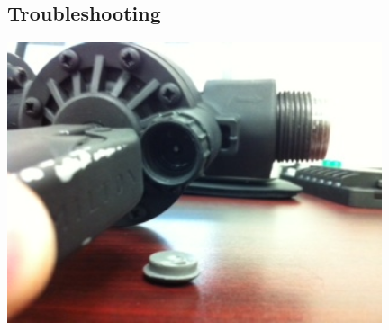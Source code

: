 \documentclass[letterpaper,12pt]{article}
\begin{document}
\subsection{Troubleshooting}
\begin{center}
    \includegraphics[width=11cm]{pics/cannon/broken_release_valve.jpg}
\end{center}
\end{document}
